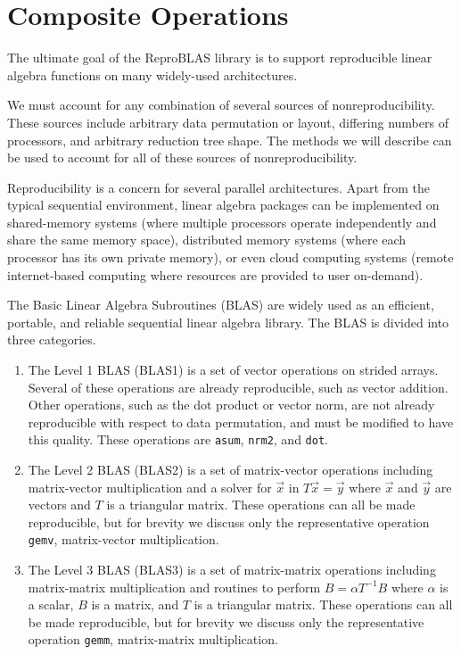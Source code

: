\section{Composite Operations}
  \label{sec:compositeops}
  The ultimate goal of the ReproBLAS library is to support reproducible linear algebra functions on many widely-used architectures.

  We must account for any combination of several sources of
  nonreproducibility. These sources include arbitrary data
  permutation or layout, differing numbers of processors, and arbitrary
  reduction tree shape. The methods we will describe can be used to
  account for all of these sources of nonreproducibility.

  Reproducibility is a concern for several parallel architectures. Apart from the typical sequential environment, linear algebra packages can be implemented on shared-memory systems (where multiple processors operate independently and share the same memory space), distributed memory systems (where each processor has its own private memory), or even cloud computing systems (remote internet-based computing where resources are provided to user on-demand).

  The Basic Linear Algebra Subroutines (BLAS) \cite{BLAS} are widely
  used as an efficient, portable, and reliable sequential linear algebra library.
  The BLAS is divided into three categories.
  \begin{enumerate}
    \item The Level 1 BLAS (BLAS1) is a set of vector operations on
      strided arrays. Several of these operations are already
      reproducible, such as vector addition. Other operations, such as
      the dot product or vector norm, are not already reproducible with
      respect to data permutation, and must be modified to have this quality. These operations
      are \texttt{asum}, \texttt{nrm2}, and 
      \texttt{dot}.
    \item The Level 2 BLAS (BLAS2) is a set of matrix-vector operations
      including matrix-vector multiplication and a solver for $\vec{x}$ in $T\vec{x} = \vec{y}$ where $\vec{x}$ and $\vec{y}$ are vectors and $T$ is a triangular matrix. These operations can all be made reproducible, but for brevity we discuss only the representative operation \texttt{gemv}, matrix-vector multiplication.
    \item The Level 3 BLAS (BLAS3) is a set of matrix-matrix operations
      including matrix-matrix multiplication and routines to perform $B = \alpha T^{-1}B$ where $\alpha$ is a scalar, $B$ is a matrix, and $T$ is a triangular matrix. These operations can all be made reproducible, but for brevity we discuss only the representative operation \texttt{gemm}, matrix-matrix multiplication.
  \end{enumerate}

